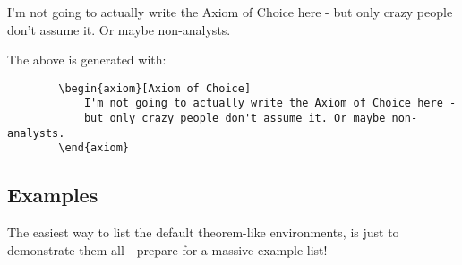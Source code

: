 \documentclass{ximera}
\begin{document}
        \begin{axiom}
            I'm not going to actually write the Axiom of Choice here - but only crazy people don't assume it. Or maybe non-analysts.
        \end{axiom}
        
        The above is generated with:
        \begin{verbatim}
        \begin{axiom}[Axiom of Choice]
            I'm not going to actually write the Axiom of Choice here - 
            but only crazy people don't assume it. Or maybe non-analysts.
        \end{axiom}        
        \end{verbatim}
        
        
    \subsection*{Examples}
        The easiest way to list the default theorem-like environments, is just to demonstrate them all - prepare for a massive example list!
        
        \begin{theorem}
            \lipsum[1][1-3]
        \end{theorem}
        
        
        \begin{theorem}[My theorem]
            \lipsum[1][1-3]
        \end{theorem}
        
        \begin{algorithm}
            \lipsum[1][1-3]
        \end{algorithm}
        
        \begin{axiom}
            \lipsum[1][1-3]
        \end{axiom}
        
        \begin{claim}
            \lipsum[1][1-3]
        \end{claim}
        
        \begin{conclusion}
            \lipsum[1][1-3]
        \end{conclusion}
        
        \begin{condition}
            \lipsum[1][1-3]
        \end{condition}
        
\end{document}

